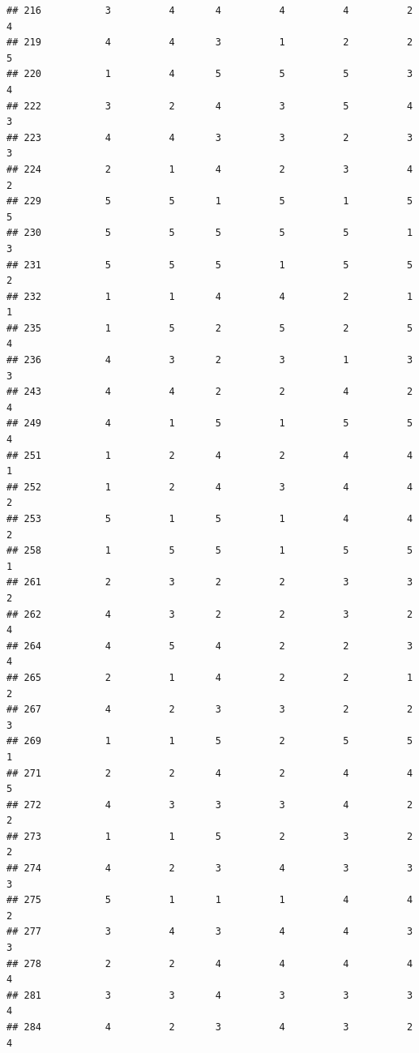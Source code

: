 \documentclass[
]{article}
\begin{document}
\begin{verbatim}
## 216           3          4       4          4          4          2        4
## 219           4          4       3          1          2          2        5
## 220           1          4       5          5          5          3        4
## 222           3          2       4          3          5          4        3
## 223           4          4       3          3          2          3        3
## 224           2          1       4          2          3          4        2
## 229           5          5       1          5          1          5        5
## 230           5          5       5          5          5          1        3
## 231           5          5       5          1          5          5        2
## 232           1          1       4          4          2          1        1
## 235           1          5       2          5          2          5        4
## 236           4          3       2          3          1          3        3
## 243           4          4       2          2          4          2        4
## 249           4          1       5          1          5          5        4
## 251           1          2       4          2          4          4        1
## 252           1          2       4          3          4          4        2
## 253           5          1       5          1          4          4        2
## 258           1          5       5          1          5          5        1
## 261           2          3       2          2          3          3        2
## 262           4          3       2          2          3          2        4
## 264           4          5       4          2          2          3        4
## 265           2          1       4          2          2          1        2
## 267           4          2       3          3          2          2        3
## 269           1          1       5          2          5          5        1
## 271           2          2       4          2          4          4        5
## 272           4          3       3          3          4          2        2
## 273           1          1       5          2          3          2        2
## 274           4          2       3          4          3          3        3
## 275           5          1       1          1          4          4        2
## 277           3          4       3          4          4          3        3
## 278           2          2       4          4          4          4        4
## 281           3          3       4          3          3          3        4
## 284           4          2       3          4          3          2        4

\end{verbatim}
\end{document}
